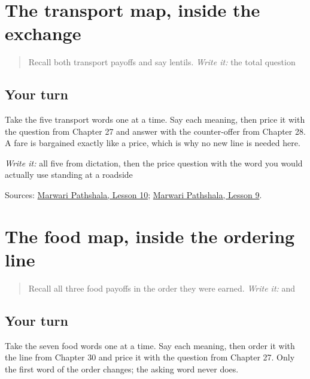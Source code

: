 \section[Practice]{The transport map, inside the exchange}

\label{lesson:MW-R26-transport-counter}



\begin{quote}
Recall both transport payoffs and say lentils. \emph{Write it:} the total question
\end{quote}

\subsection*{Your turn}
Take the five transport words one at a time. Say each meaning, then price it with the question from Chapter 27 and answer with the counter-offer from Chapter 28. A fare is bargained exactly like a price, which is why no new line is needed here.

\emph{Write it:} all five from dictation, then the price question with the word you would actually use standing at a roadside

\begin{tcolorbox}[breakable,colback=teal!4,colframe=teal!35!black,title={Before you move on}]
Sources: \href{https://www.marwaripathshala.com/marwari-lesson-10-english}{Marwari Pathshala, Lesson 10}; \href{https://www.marwaripathshala.com/marwari-lesson-9-english}{Marwari Pathshala, Lesson 9}.
\end{tcolorbox}
\section[Practice]{The food map, inside the ordering line}

\label{lesson:MW-R26-food-counter}



\begin{quote}
Recall all three food payoffs in the order they were earned. \emph{Write it:} \textbf{} and \textbf{}
\end{quote}

\subsection*{Your turn}
Take the seven food words one at a time. Say each meaning, then order it with the line from Chapter 30 and price it with the question from Chapter 27. Only the first word of the order changes; the asking word never does.

